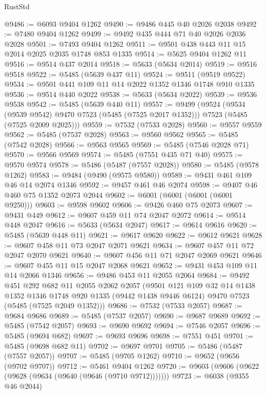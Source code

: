 \begin{lexlean}{RustStd}
\begin{coremodule}
@9486 := @6093 @9404 @1262
@9490 := @9486 @445 @40 @2026 @2038
@9492 := @7480 @9404 @1262
@9499 := @9492 @435 @444 @71 @40 @2026 @2036 @2028
@9501 := @7493 @9404 @1262
@9511 := @9501 @438 @443 @11 @15 @2014 @2025 @2035 @1748 @853 @1335
@9514 := @5625 @9404 @1262 @11
@9516 := @9514 @437 @2014
@9518 := @5633 (@5634 @2014)
@9519 := @9516 @9518
@9522 := @5485 (@5639 @437 @11)
@9524 := @9511 (@9519 @9522)
@9534 := @9501 @441 @109 @11 @14 @2022 @1352 @1346 @1748 @910 @1335
@9536 := @9514 @440 @2022
@9538 := @5633 (@5634 @2022)
@9539 := @9536 @9538
@9542 := @5485 (@5639 @440 @11)
@9557 := @9499
    (@9524
      (@9534 (@9539 @9542) @9470 @7523 (@5485 (@7525 @2017 @1352)))
      @7523
      (@5485 (@7525 @2009 @2025)))
@9559 := @7532 (@7533 @2028)
@9560 := @9557 @9559
@9562 := @5485 (@7537 @2028)
@9563 := @9560 @9562
@9565 := @5485 (@7542 @2028)
@9566 := @9563 @9565
@9569 := @5485 (@7546 @2028 @71)
@9570 := @9566 @9569
@9574 := @5485 (@7551 @435 @71 @40)
@9575 := @9570 @9574
@9578 := @5486 (@5487 (@7557 @2028))
@9580 := @5485 (@9578 @1262)
@9583 := @9484 (@9490 (@9575 @9580))
@9589 := @9431 @461 @109 @46 @14 @2074 @1346
@9592 := @9457 @461 @46 @2074
@9598 := @9407 @46 @460 @75 @1352 @2073 @2044
@9602 := @6001 (@6001 (@6001 (@6001 @9250)))
@9603 := @9598 @9602
@9606 := @9426 @460 @75 @2073
@9607 := @9431 @449
@9612 := @9607 @459 @11 @74 @2047 @2072
@9614 := @9514 @448 @2047
@9616 := @5633 (@5634 @2047)
@9617 := @9614 @9616
@9620 := @5485 (@5639 @448 @11)
@9621 := @9617 @9620
@9622 := @9612 @9621
@9628 := @9607 @458 @11 @73 @2047 @2071 @9621
@9634 := @9607 @457 @11 @72 @2047 @2070 @9621
@9640 := @9607 @456 @11 @71 @2047 @2069 @9621
@9646 := @9607 @455 @11 @15 @2047 @2068 @9621
@9652 := @9431 @453 @109 @11 @14 @2066 @1346
@9656 := @9486 @453 @11 @2055 @2064
@9684 := @9492
    @451
    @292
    @682
    @11
    @2055
    @2062
    @2057
    (@9501
      @121
      @109
      @32
      @14
      @1438
      @1352
      @1346
      @1748
      @920
      @1335
      (@9442 @1438 @9446 @6124)
      @9470
      @7523
      (@5485 (@7525 @2049 @1352)))
@9686 := @7532 (@7533 @2057)
@9687 := @9684 @9686
@9689 := @5485 (@7537 @2057)
@9690 := @9687 @9689
@9692 := @5485 (@7542 @2057)
@9693 := @9690 @9692
@9694 := @7546 @2057
@9696 := @5485 (@9694 @682)
@9697 := @9693 @9696
@9698 := @7551 @451
@9701 := @5485 (@9698 @682 @11)
@9702 := @9697 @9701
@9705 := @5486 (@5487 (@7557 @2057))
@9707 := @5485 (@9705 @1262)
@9710 := @9652 (@9656 (@9702 @9707))
@9712 := @5461 @9404 @1262
@9720 := @9603 (@9606 (@9622 (@9628 (@9634 (@9640 (@9646 (@9710 @9712)))))))
@9723 := @6038 (@9355 @46 @2044)

\end{coremodule}
\end{lexlean}
